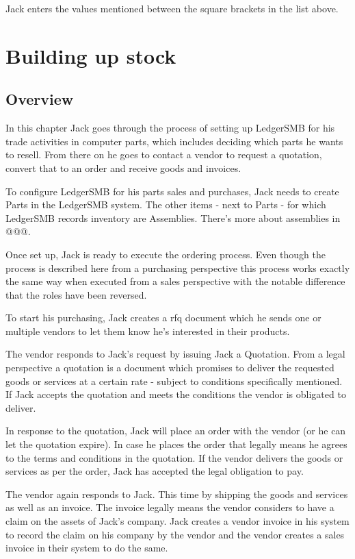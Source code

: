 Jack enters the values mentioned between the square brackets in the list above.



\chapter{Building up stock}
\label{cha:building-up-stock}

\section{Overview}

In this chapter Jack goes through the process of setting up LedgerSMB for his
trade activities in computer parts, which includes deciding which parts he wants to
resell. From there on he goes to contact a vendor to request a quotation, convert that
to an order and receive goods and invoices.

To configure LedgerSMB for his parts sales and purchases, Jack needs to create Parts
in the LedgerSMB system. The other items - next to Parts - for which LedgerSMB records
inventory are Assemblies. There's more about assemblies in @@@.

Once set up, Jack is ready to execute the ordering process. Even though the process
is described here from a purchasing perspective this process works exactly the same way
when executed from a sales perspective with the notable difference that the roles have
been reversed.

To start his purchasing, Jack creates a \gls{rfq} document which
he sends one or multiple vendors to let them know he's interested in their products.

The vendor responds to Jack's request by issuing Jack a Quotation. From a legal perspective
a quotation is a document which promises to deliver the requested goods or services at a
certain rate - subject to conditions specifically mentioned. If Jack accepts the quotation
and meets the conditions the vendor is obligated to deliver.

In response to the quotation, Jack will place an order with the vendor (or he can let the
quotation expire). In case he places the order that legally means he agrees to the terms
and conditions in the quotation. If the vendor delivers the goods or services as per the
order, Jack has accepted the legal obligation to pay.

The vendor again responds to Jack. This time by shipping the goods and services as well
as an invoice. The invoice legally means the vendor considers to have a claim on the assets
of Jack's company. Jack creates a vendor invoice in his system to record the claim on his
company by the vendor and the vendor creates a sales invoice in their system to do the same.

